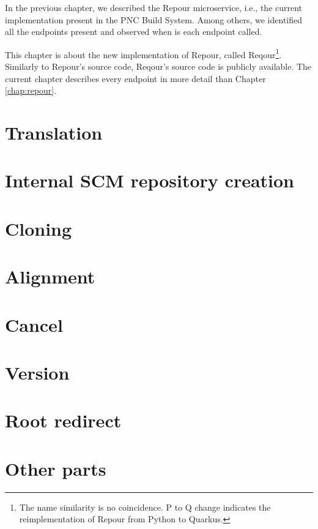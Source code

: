 \documentclass[../../main.tex]{subfiles}
\begin{document}
In the previous chapter, we described the Repour microservice, i.e., the current implementation present in the PNC Build System. Among others, we identified all the endpoints present and observed when is each endpoint called.

This chapter is about the new implementation of Repour, called Reqour\footnote{The name similarity is no coincidence. P to Q change indicates the reimplementation of Repour from Python to Quarkus.}. Similarly to Repour's source code, Reqour's source code is publicly available\cite{reqour}. The current chapter describes every endpoint in more detail than Chapter \ref{chap:repour}.

\section{Translation}


\section{Internal SCM repository creation}


\section{Cloning}


\section{Alignment}
\label{section:alignment}


\section{Cancel}


\section{Version}


\section{Root redirect}


\section{Other parts}

\end{document}
